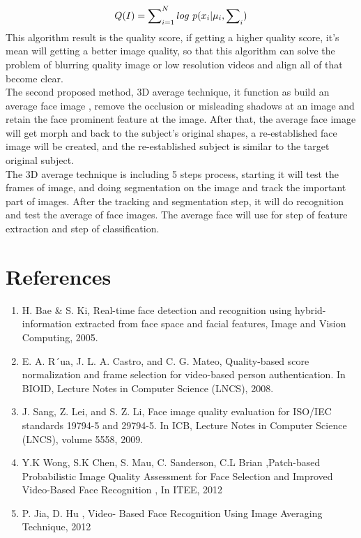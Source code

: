 \documentclass[12pt]{article}
\begin{document}
\[Q(I)=\sum\nolimits^{N}_{i=1}log\space\ p(x_{i}|\mu_{i},\sum\nolimits_{i})\]
This algorithm result is the quality score, if getting a higher quality score, it’s mean will getting a better image quality, so that this algorithm can solve the problem of blurring quality image or low resolution videos and align all of that become clear.\vspace{3mm}\\
The second proposed method, 3D average technique, it function as build an average face image , remove the occlusion or misleading shadows at an image and retain the face prominent feature at the image. After that, the average face image will get morph and back to the subject’s original shapes, a re-established face image will be created, and the re-established subject is similar to the target original subject.\vspace{3mm}\\
The 3D average technique is including 5 steps process, starting it will test the frames of image, and doing segmentation on the image and track the important part of images. After the tracking and segmentation step, it will do recognition and test the average of face images. The average face will use for step of feature extraction and step of classification.

\section{References}
\begin{enumerate}
\item H. Bae \& S. Ki, Real-time face detection and recognition using hybrid-information extracted from face space and facial features, Image and Vision Computing, 2005.
\item E. A. R´ua, J. L. A. Castro, and C. G. Mateo, Quality-based score normalization and frame selection for video-based person
authentication. In BIOID, Lecture Notes in Computer Science (LNCS), 2008.
\item J. Sang, Z. Lei, and S. Z. Li, Face image quality evaluation for ISO/IEC standards 19794-5 and 29794-5. In ICB, Lecture
Notes in Computer Science (LNCS), volume 5558, 2009.
\item Y.K Wong, S.K Chen, S. Mau, C. Sanderson, C.L Brian ,Patch-based Probabilistic Image Quality Assessment for Face Selection and Improved Video-Based Face Recognition , In ITEE, 2012
\item P. Jia, D. Hu , Video- Based Face Recognition Using Image Averaging Technique, 2012
\end{enumerate}
\end{document}
